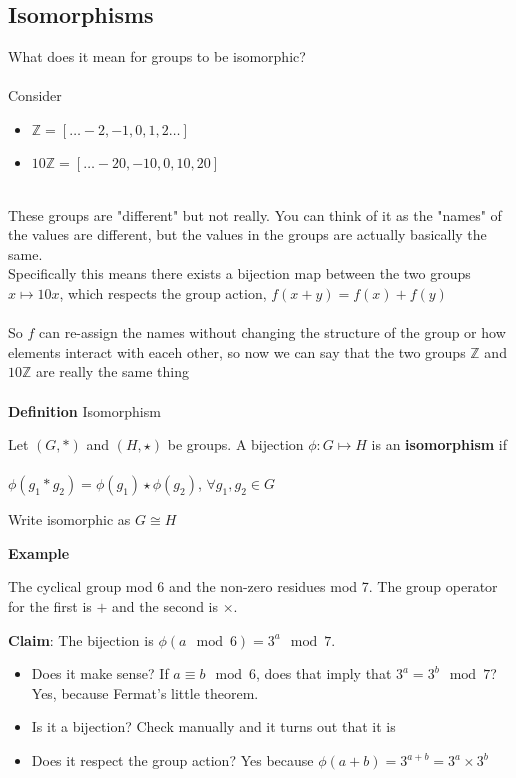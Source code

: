 \documentclass{article}
\begin{document}
\subsection{Isomorphisms}
What does it mean for groups to be isomorphic?
~\\
~\\
Consider 
\begin{itemize}
	\item $\mathbb{Z} = [\ldots -2,-1,0,1,2 \ldots]$ 
	\item $10\mathbb{Z}= [\ldots -20,-10,0,10,20]$	
\end{itemize}
~\\
These groups are "different" but not really. You can think of it as the "names" of the values are different, but the values in the groups are actually basically the same.
~\\
Specifically this means there exists a bijection map between the two groups $x \mapsto 10x$, which respects the group action, $f\left( x + y \right) = f\left( x \right) + f\left( y \right) $
~\\
~\\
So $f$ can re-assign the names without changing the structure of the group or how elements interact with eaceh other, so now we can say that the two groups  $\mathbb{Z}$ and  $10\mathbb{Z}$ are really the same thing
~\\
~\\
\textbf{Definition}  Isomorphism 
\begin{framed}
	Let $\left( G,* \right) $ and $(H,\star)$ be groups. A bijection  $\phi:G\mapsto H$ is an \textbf{isomorphism} if \\ 
	~\\
	\indent $\phi\left(g_1 * g_2  \right) = \phi(g_1) \star \phi(g_2)$,  $\forall g_1,g_2 \in G$
\end{framed}
Write isomorphic as $G\cong H$

\textbf{Example}
\begin{framed}
	The cyclical group mod 6 and the non-zero residues mod 7. The group operator for the first is $+$ and the second is $\times$. 
	\begin{center}
		\textbf{Claim}: The bijection is $\phi(a \mod 6) = 3^a \mod 7$. 
        \end{center}
	\begin{itemize}
		\item Does it make sense? If $a \equiv b \mod 6$, does that imply that $3^a = 3^b \mod 7$? Yes, because Fermat's little theorem.
		\item Is it a bijection? Check manually and it turns out that it is
		\item Does it respect the group action? Yes because $\phi(a+b) = 3^{a+b} = 3^a \times 3^b$
	\end{itemize}
\end{framed}
\end{document}
